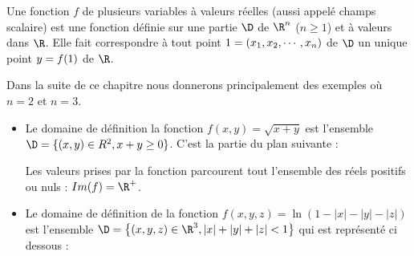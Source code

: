 \begin{definition}
		Une fonction $f$ de plusieurs variables à valeurs réelles (aussi appelé champs scalaire) est une fonction définie sur une partie $\D$ de $\R^n$ ($n\geq 1$) et à valeurs dans $\R$. Elle fait correspondre à tout point $1 =(x_1,x_2,\cdots,x_n)$ de $\D$ un unique point $y = f(1)$ de $\R$.
\end{definition}

Dans la suite de ce chapitre nous donnerons principalement des exemples où $n=2$ et $n=3$. %

\begin{exemple} \label{exemple.fpv}
	\begin{itemize}
		\item	Le domaine de définition la fonction $f(x,y) = \sqrt{x+y}$ est l'ensemble $\D = \{(x,y) \in R^2, x + y \geq  0\}$. C'est la partie du plan suivante :
			\begin{center}
				\begin{minipage}{5cm}
					 
				\end{minipage}
			\end{center}
			Les valeurs prises par la fonction parcourent tout l'ensemble des réels positifs ou nuls : $Im(f) = \R^+$.
		\item Le domaine de définition de la fonction $f(x,y,z) = \ln(1 - |x| - |y| - |z|)$ est l'ensemble $\D = \big\{ (x,y,z)\in\R^3, |x|+|y|+|z| < 1 \big\}$ qui est représenté ci dessous :
			\begin{center}
				\begin{minipage}{5cm}
				\end{minipage}
			\end{center}
	\end{itemize}
\end{exemple}


